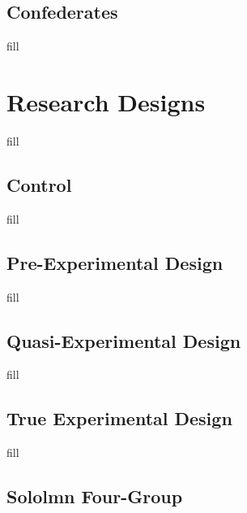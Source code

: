 \documentclass[
  b5paper]{book}
\begin{document}
\hypertarget{confederates}{%
\subsection*{Confederates}\label{confederates}}

fill

\hypertarget{research-designs}{%
\section{Research Designs}\label{research-designs}}

fill

\hypertarget{control}{%
\subsection*{Control}\label{control}}

fill

\hypertarget{pre-experimental-design}{%
\subsection*{Pre-Experimental Design}\label{pre-experimental-design}}

fill

\hypertarget{quasi-experimental-design}{%
\subsection*{Quasi-Experimental Design}\label{quasi-experimental-design}}

fill

\hypertarget{true-experimental-design}{%
\subsection*{True Experimental Design}\label{true-experimental-design}}

fill

\hypertarget{sololmn-four-group}{%
\subsection*{Sololmn Four-Group}\label{sololmn-four-group}}
\end{document}
